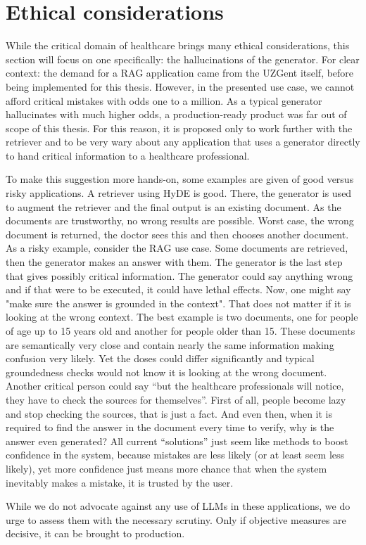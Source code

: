 \section{Ethical considerations}
\label{Ethical considerations}
While the critical domain of healthcare brings many ethical considerations, this section will focus on one specifically: the hallucinations of the generator. For clear context: the demand for a RAG application came from the UZGent itself, before being implemented for this thesis. However, in the presented use case, we cannot afford critical mistakes with odds one to a million. As a typical generator hallucinates with much higher odds, a production-ready product was far out of scope of this thesis. For this reason, it is proposed only to work further with the retriever and to be very wary about any application that uses a generator directly to hand critical information to a healthcare professional. 

To make this suggestion more hands-on, some examples are given of good versus risky applications. A retriever using HyDE is good. There, the generator is used to augment the retriever and the final output is an existing document. As the documents are trustworthy, no wrong results are possible. Worst case, the wrong document is returned, the doctor sees this and then chooses another document. As a risky example, consider the RAG use case. Some documents are retrieved, then the generator makes an answer with them. The generator is the last step that gives possibly critical information. The generator could say anything wrong and if that were to be executed, it could have lethal effects. Now, one might say "make sure the answer is grounded in the context". That does not matter if it is looking at the wrong context. The best example is two documents, one for people of age up to 15 years old and another for people older than 15. These documents are semantically very close and contain nearly the same information making confusion very likely. Yet the doses could differ significantly and typical groundedness checks would not know it is looking at the wrong document. Another critical person could say ``but the healthcare professionals will notice, they have to check the sources for themselves''. First of all, people become lazy and stop checking the sources, that is just a fact. And even then, when it is required to find the answer in the document every time to verify, why is the answer even generated? All current ``solutions'' just seem like methods to boost confidence in the system, because mistakes are less likely (or at least seem less likely), yet more confidence just means more chance that when the system inevitably makes a mistake, it is trusted by the user.

While we do not advocate against any use of LLMs in these applications, we do urge to assess them with the necessary scrutiny. Only if objective measures are decisive, it can be brought to production.

